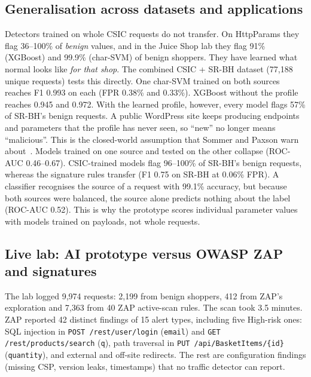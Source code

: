\documentclass[conference]{IEEEtran}
\begin{document}
\subsection{Generalisation across datasets and applications}
Detectors trained on whole CSIC requests do not transfer. On HttpParams they flag 36--100\% of
\emph{benign} values, and in the Juice Shop lab they flag 91\% (XGBoost) and 99.9\% (char-SVM) of benign
shoppers. They have learned what normal looks like \emph{for that shop}.
The combined CSIC + SR-BH dataset (77,188 unique requests) tests this directly. One char-SVM trained on
both sources reaches F1 0.993 on each (FPR 0.38\% and 0.33\%). XGBoost without the profile reaches 0.945 and
0.972. With the learned profile, however, every model flags 57\% of SR-BH's benign requests. A public
WordPress site keeps producing endpoints and parameters that the profile has never seen, so ``new''
no longer means ``malicious''. This is the closed-world assumption that Sommer and Paxson warn
about~\cite{sommer2010}. Models trained on one source and tested on the other collapse (ROC-AUC 0.46--0.67). CSIC-trained models flag 96--100\% of SR-BH's benign requests, whereas the signature rules transfer (F1 0.75 on SR-BH at 0.06\% FPR). A classifier recognises the source of a request with 99.1\% accuracy, but because both sources were balanced, the source alone predicts nothing about the label (ROC-AUC 0.52).
This is why the prototype scores individual parameter values with models trained on payloads, not
whole requests.

\subsection{Live lab: AI prototype versus OWASP ZAP and signatures}
The lab logged 9,974 requests: 2,199 from benign shoppers, 412 from ZAP's exploration and 7,363 from
40 ZAP active-scan rules. The scan took 3.5 minutes. ZAP reported 42 distinct findings of 15 alert types,
including five High-risk ones: SQL injection in \texttt{POST /rest/user/login} (\texttt{email}) and
\texttt{GET /rest/products/search} (\texttt{q}), path traversal in \texttt{PUT /api/BasketItems/\{id\}}
(\texttt{quantity}), and external and off-site redirects. The rest are configuration findings (missing CSP,
version leaks, timestamps) that no traffic detector can report.
\end{document}
